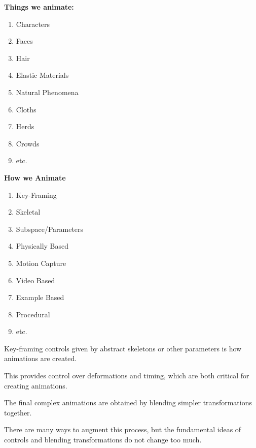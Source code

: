 \documentclass{article}
\begin{document}
\begin{minipage}{0.49\textwidth}
    \textbf{Things we animate:}
    \begin{enumerate}[font=\bfseries]
        \itemsep-0.1em
        \item Characters
        \item Faces
        \item Hair
        \item Elastic Materials
        \item Natural Phenomena
        \item Cloths
        \item Herds
        \item Crowds
        \item etc.
    \end{enumerate}  
\end{minipage}
\begin{minipage}{0.49\textwidth}
    \textbf{How we Animate}
    \begin{enumerate}[font=\bfseries]
        \itemsep-0.1em
        \item Key-Framing
        \item Skeletal
        \item Subspace/Parameters
        \item Physically Based
        \item Motion Capture
        \item Video Based
        \item Example Based
        \item Procedural
        \item etc.
    \end{enumerate}
\end{minipage}

\vspace{15px}

Key-framing controls given by abstract skeletons or other parameters is how animations are created.

This provides control over deformations and timing, which are both critical for creating animations.

The final complex animations are obtained by blending simpler transformations together.

\vspace{5px}

There are many ways to augment this process, but the fundamental ideas of controls and blending
transformations do not change too much.
\end{document}
